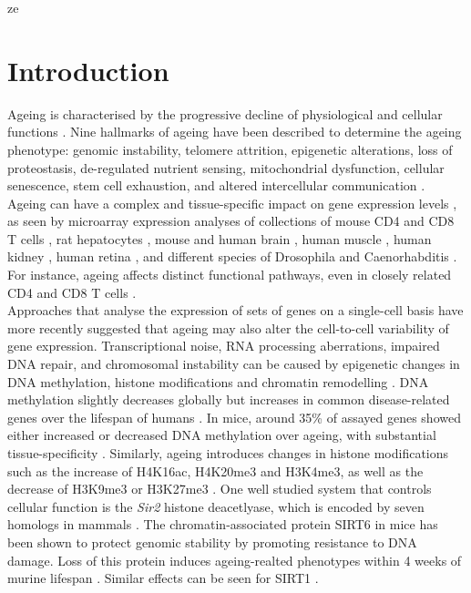 ze

\section{Introduction}

Ageing is characterised by the progressive decline of physiological and cellular functions \citep{Lopez-Otin2013, Booth2016}. Nine hallmarks of ageing have been described to determine the ageing phenotype: genomic instability, telomere attrition, epigenetic alterations, loss of proteostasis, de-regulated nutrient sensing, mitochondrial dysfunction, cellular senescence, stem cell exhaustion, and altered intercellular communication \citep{Lopez-Otin2013}. Ageing can have a complex and tissue-specific impact on gene expression levels \citep{Zahn2007}, as seen by microarray expression analyses of collections of mouse CD4\plus{} and CD8\plus{} T cells \citep{Mirza2011}, rat hepatocytes \citep{Tollet-Egnell2000}, mouse and human brain \citep{Lu2004, Lee2000}, human muscle \citep{Welle2003, Zahn2006}, human kidney \citep{Rodwell2004}, human retina \citep{Yoshida2002}, and different species of Drosophila and Caenorhabditis \citep{Mccarroll2004}. For instance, ageing affects distinct functional pathways, even in closely related CD4\plus{} and CD8\plus{} T cells \citep{Mirza2011}. \\

Approaches that analyse the expression of sets of genes on a single-cell basis have more recently suggested that ageing may also alter the cell-to-cell variability of gene expression. Transcriptional noise, RNA processing aberrations, impaired DNA repair, and chromosomal instability can be caused by epigenetic changes in DNA methylation, histone modifications and chromatin remodelling \citep{Lopez-Otin2013}. DNA methylation slightly decreases globally but increases in common disease-related genes over the lifespan of humans \citep{Talens2012}. In mice, around 35\% of assayed genes showed either increased or decreased DNA methylation over ageing, with substantial tissue-specificity \citep{Maegawa2010}. Similarly, ageing introduces changes in histone modifications such as the increase of \gls{H4K16ac}, \gls{H4K20me3} and \gls{H3K4me3}, as well as the decrease of \gls{H3K9me3} or \gls{H3K27me3} \citep{Han2012, Fraga2007}. One well studied system that controls cellular function is the \emph{\gls{Sir}2} histone deacetlyase, which is encoded by seven homologs in mammals \citep{Houtkooper2016}. The chromatin-associated protein SIRT6 in mice has been shown to protect genomic stability by promoting resistance to DNA damage. Loss of this protein induces ageing-realted phenotypes within 4 weeks of murine lifespan \cite{Mostoslavsky2006}. Similar effects can be seen for SIRT1 \cite{Oberdoerffer2008}.\\

